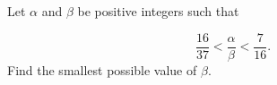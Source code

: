 Let $\alpha$ and $\beta$ be positive integers such that

\[
\dfrac{16}{37}<\dfrac{\alpha}{\beta}<\dfrac{7}{16} .
\]Find the smallest possible value of $\beta$.
